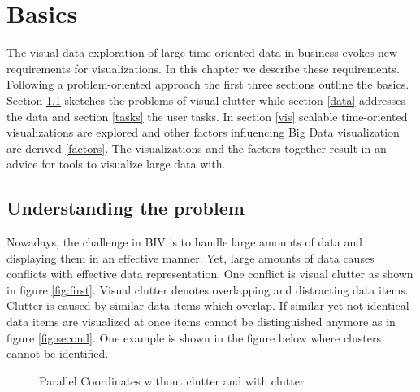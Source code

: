 \chapter{Basics}\label{chap:BIV}

The visual data exploration of large time-oriented data in business evokes new requirements for visualizations. In this chapter we describe these requirements. Following a problem-oriented approach the first three sections outline the basics. Section \ref{problems} sketches the problems of visual clutter while section \ref{data} addresses the data and section \ref{tasks} the user tasks. In section \ref{vis} scalable time-oriented visualizations are explored and other factors influencing Big Data visualization are derived \ref{factors}. The visualizations and the factors together result in an advice for tools to visualize large data with.

 \section{Understanding the problem}\label{problems}
 Nowadays, the challenge in BIV is to handle large amounts of data and displaying them in an effective manner. Yet, large amounts of data causes conflicts with effective data representation. One conflict is visual clutter as shown in figure \ref{fig:first}. Visual clutter denotes overlapping and distracting data items. Clutter is caused by similar data items which overlap. If similar yet not identical data items are visualized at once items cannot be distinguished anymore as in figure \ref{fig:second}. One example is shown in the figure below where clusters cannot be identified.
 
\begin{figure}
 \centering
{}
\qquad
{}
\caption{Parallel Coordinates without clutter and with clutter}
\end{figure}
 
